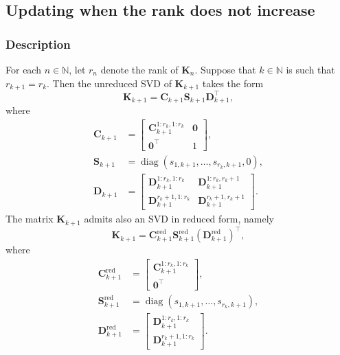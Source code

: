 \documentclass[11pt,a4paper]{article}
\DeclareMathOperator*{\diag}{diag}
\newcommand{\0}{\M{0}}
\newcommand{\M}[1]{\mathbf{#1}}
\newcommand{\Mr}[1]{{\M{#1}}^{\mathrm{red}}}
\newcommand{\N}{\mathbb{N}}
\newcommand{\T}{\top}
\begin{document}
\subsection{Updating when the rank does not increase}

\subsubsection{Description}

For each $n \in \N$, let $r_n$ denote the rank of $\M{K}_n$. Suppose that $k \in \N$ is such that $r_{k+1} = r_k$. Then the unreduced SVD of $\M{K}_{k+1}$ takes the form
\begin{displaymath}
  \M{K}_{k+1} = \M{C}_{k+1} \M{S}_{k+1} \M{D}^\T_{k+1},
\end{displaymath}
where
\begin{align*}
  \M{C}_{k+1}
  & =
  \begin{bmatrix}
    \M{C}^{1:r_k, 1:r_k}_{k+1} & \0
    \\
    \0^\T & 1
  \end{bmatrix},
  \\[2ex]
  \M{S}_{k+1}
  & =
    \diag(s_{1,k+1}, \dots, s_{r_k,k+1}, 0),
  \\[2ex]
  \M{D}_{k+1}
  & =
    \begin{bmatrix}
      \M{D}^{1:r_k, 1:r_k}_{k+1} & \M{D}^{1:r_k, r_k+1}_{k+1}
      \\
      \M{D}^{r_k+1, 1:r_k}_{k+1} & \M{D}^{r_k+1, r_k+1}_{k+1}
    \end{bmatrix}.
\end{align*}
The matrix $\M{K}_{k+1}$ admits also an SVD in reduced form, namely
\begin{displaymath}
  \M{K}_{k+1} = \Mr{C}_{k+1} \Mr{S}_{k+1} (\Mr{D}_{k+1})^\T,
\end{displaymath}
where
\begin{align*}
  \Mr{C}_{k+1}
  & =
  \begin{bmatrix}
    \M{C}^{1:r_k, 1:r_k}_{k+1} 
    \\
    \0^\T 
  \end{bmatrix},
  \\[2ex]
  \Mr{S}_{k+1}
  & =
    \diag(s_{1,k+1}, \dots, s_{r_k,k+1}),
  \\[2ex]
  \Mr{D}_{k+1}
  & =
    \begin{bmatrix}
      \M{D}^{1:r_k, 1:r_k}_{k+1} 
      \\
      \M{D}^{r_k+1, 1:r_k}_{k+1} 
    \end{bmatrix}.
\end{align*}
\end{document}
